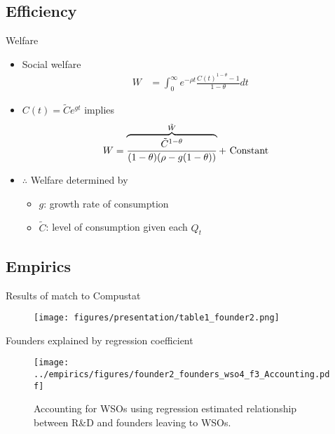\documentclass[english,usenames,dvipsnames]{beamer}
\begin{document}
\subsection{Efficiency}

\begin{frame}{Welfare}\label{welfare}
	\hyperlink{efficiency}{}
	\begin{itemize}
		\item Social welfare
		\begin{align*}
		W &= \int_0^{\infty} e^{-\rho t} \frac{C(t)^{1-\theta} - 1}{1-\theta} dt
		\end{align*}
		\item $C(t) = \tilde{C} e^{gt}$ implies
		\begin{align*}
		W &= \overbrace{\frac{\tilde{C}^{1-\theta}}{(1-\theta)(\rho - g(1-\theta))}}^{\mathclap{\tilde{W}}} + \text{ Constant} 
		\end{align*}
		\item $\therefore$ Welfare determined by
		\begin{itemize}
			\item $g$: growth rate of consumption 
			\item $\tilde{C}$: level of consumption given each $Q_t$ 
		\end{itemize}
	\end{itemize}
\end{frame}

\subsection{Empirics}


\begin{frame}{Results of match to Compustat}\label{results_of_match}
	\hyperlink{economic_magnitude}{}
	\begin{figure}
		\texttt{[image: figures/presentation/table1\_founder2.png]}
	\end{figure}
\end{frame}

\begin{frame}{Founders explained by regression coefficient}\label{regs_economic_significance}
	\hyperlink{economic_magnitude}{}
	\begin{figure}[!htb]
		\texttt{[image: ../empirics/figures/founder2\_founders\_wso4\_f3\_Accounting.pdf]}
		\caption{\small Accounting for WSOs using regression estimated relationship between R\&D and founders leaving to WSOs.}
	\end{figure}
\end{frame}
\end{document}
